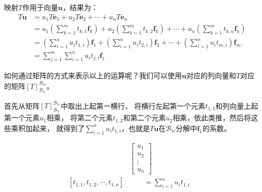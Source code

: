 \documentclass[12pt,UTF8,fontset=none]{ctexbook}
\begin{document}
映射$T$作用于向量$\mathbf{u}$，结果为：
\begin{align*}
    T\mathbf{u} &= u_1T\mathbf{e}_1 + u_2T\mathbf{e}_2 + \cdots + u_nT\mathbf{e}_n  \\
                &= u_1\left(\sum_{k=1}^m t_{k,1}\mathbf{f}_k\right) + u_2\left(\sum_{k=1}^m t_{k,2}\mathbf{f}_k\right) + \cdots + u_n \left(\sum_{k=1}^m t_{k,n}\mathbf{f}_k\right)  \\
                &= \left(\sum_{i=1}^n u_i t_{1,i}\right) \mathbf{f}_1 + \left(\sum_{i=1}^n u_i t_{2,i}\right) \mathbf{f}_2 + \cdots + \left(\sum_{i=1}^n u_i t_{m,i}\right) \mathbf{f}_m.  \\
                &= \sum_{j=1}^m \sum_{i=1}^n u_i t_{j,i} \mathbf{f}_j 
\end{align*} 

如何通过矩阵的方式来表示以上的运算呢？我们可以使用$\mathbf{u}$对应的列向量和$T$对应的矩阵$[T]_{\mathcal{B}_{\mathbb{V}}}^{\mathcal{B}_{\mathbb{W}}}$。

首先从矩阵$[T]_{\mathcal{B}_{\mathbb{V}}}^{\mathcal{B}_{\mathbb{W}}}$中取出上起第一横行，
将横行左起第一个元素$t_{1,1}$和列向量上起第一个元素$u_1$相乘，
将第二个元素$t_{1,2}$和第二个元素$u_2$相乘，依此类推，然后将这些乘积加起来，
就得到了$\sum_{i=1}^n u_i t_{1,i}$，也就是$T\mathbf{u}$在$\mathcal{B}_{\mathbb{W}}$分解中$\mathbf{f}_1$的系数。

\begin{align*}
& \begin{bmatrix}u_1\\u_2\\ \vdots \\u_n \end{bmatrix} & \\
   [t_{1,1}, t_{1,2} , \cdots , t_{1,n}] & \qquad = \sum_{i=1}^n u_i t_{1,i} 
\end{align*}
\end{document}
